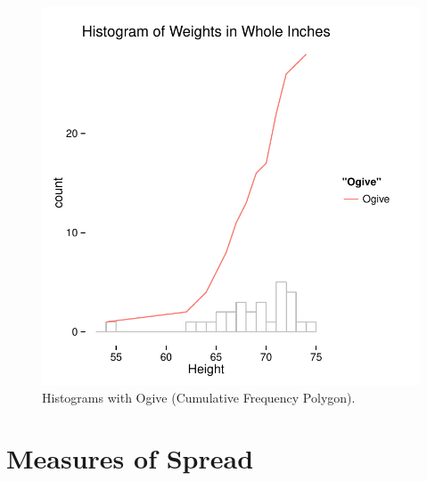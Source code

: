 \documentclass[nohyper,justified]{tufte-handout}\usepackage[]{graphicx}\usepackage[]{color}
\newenvironment{knitrout}{}{} %
\begin{document}
\begin{knitrout}
\color{fgcolor}\begin{figure}

{\centering \includegraphics[width=.49\linewidth]{figure/graphics-ogive-1} 

}

\caption[Histograms with Ogive (Cumulative Frequency Polygon)]{Histograms with Ogive (Cumulative Frequency Polygon).}\label{fig:ogive}
\end{figure}


\end{knitrout}

\section{Measures of Spread}
\end{document}
